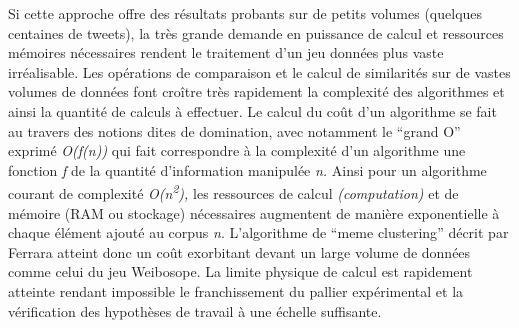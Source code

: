 Si cette approche offre des r\'esultats probants sur de petits volumes
(quelques centaines de tweets), la tr\`es grande demande en puissance
de calcul et ressources m\'emoires n\'ecessaires rendent le traitement
d{\textquoteright}un jeu donn\'ees plus vaste irr\'ealisable. Les
op\'erations de comparaison et le calcul de similarit\'es sur de vastes
volumes de donn\'ees font cro\^itre tr\`es rapidement la complexit\'e
des algorithmes et ainsi la quantit\'e de calculs \`a effectuer. Le
calcul du co\^ut d{\textquoteright}un algorithme se fait au travers des
notions dites de domination, avec notamment le {\textquotedblleft}grand
O{\textquotedblright} exprim\'e \textit{O(f(n)) }qui fait correspondre
\`a la complexit\'e d{\textquoteright}un algorithme une fonction
\textit{f} de la quantit\'e d{\textquoteright}information manipul\'ee
\textit{n. }Ainsi pour un algorithme courant de complexit\'e
\textit{O(n}\textit{\textsuperscript{2}}\textit{), }les ressources de
calcul \textit{(computation)} et de m\'emoire (RAM ou stockage)
n\'ecessaires augmentent de mani\`ere exponentielle \`a chaque
\'el\'ement ajout\'e au corpus \textit{n}. L{\textquoteright}algorithme
de {\textquotedblleft}meme clustering{\textquotedblright} d\'ecrit par
Ferrara atteint donc un co\^ut exorbitant devant un large volume de
donn\'ees comme celui du jeu Weibosope. La limite physique de calcul
est rapidement atteinte rendant impossible le franchissement du pallier
exp\'erimental et la v\'erification des hypoth\`eses de travail \`a une
\'echelle suffisante.

